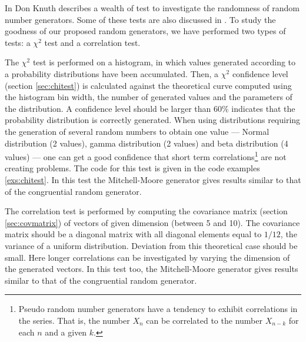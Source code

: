 \documentclass[twoside]{book}
\begin{document}
In \cite{Knuth2} Don Knuth describes a wealth of test to
investigate the randomness of random number generators. Some of
these tests are also discussed in \cite{LawKel}. To study the
goodness of our proposed random generators, we have performed two
types of tests: a $\chi^2$ test and a correlation test.

The $\chi^2$ test is performed on a histogram, in which values
generated according to a probability distributions have been
accumulated. Then, a $\chi^2$ confidence level (\cf section
\ref{sec:chitest}) is calculated against the theoretical curve
computed using the histogram bin width, the number of generated
values and the parameters of the distribution. A confidence level
should be larger than $60\%$ indicates that the probability
distribution is correctly generated. When using distributions
requiring the generation of several random numbers to obtain one
value --- Normal distribution (2 values), gamma distribution (2
values) and beta distribution (4 values)
--- one can get a good confidence that short term
correlations\footnote{Pseudo random number generators have a
tendency to exhibit correlations in the series. That is, the
number $X_n$ can be correlated to the number $X_{n-k}$ for each
$n$ and a given $k$.} are not creating problems. The code for this
test is given in the code examples \ref{exs:chitest}. In this test the Mitchell-Moore
generator gives results similar to that of the congruential random
generator.

The correlation test is performed by computing the covariance
matrix (\cf section \ref{sec:covmatrix}) of vectors of given
dimension (between 5 and 10). The covariance matrix should be a
diagonal matrix with all diagonal elements equal to $1/12$, the
variance of a uniform distribution. Deviation from this
theoretical case should be small. Here longer correlations can be
investigated by varying the dimension of the generated vectors. In
this test too, the Mitchell-Moore generator gives results similar
to that of the congruential random generator.
\end{document}
